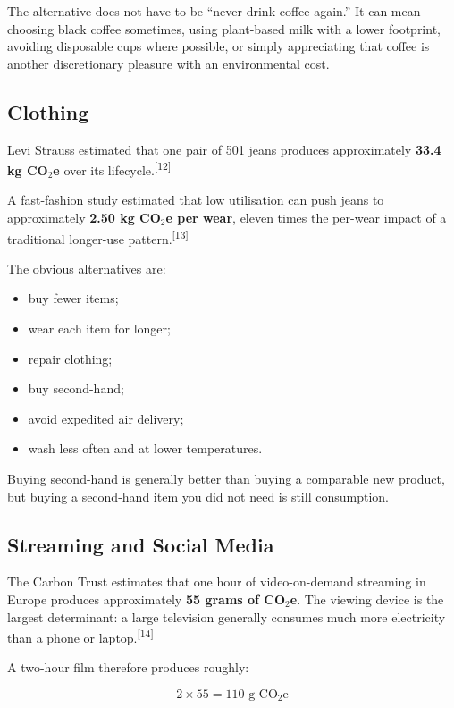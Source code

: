 \documentclass{article}
\begin{document}
The alternative does not have to be ``never drink coffee again.'' It can mean choosing black coffee sometimes, using plant-based milk with a lower footprint, avoiding disposable cups where possible, or simply appreciating that coffee is another discretionary pleasure with an environmental cost.

\subsection*{Clothing}

Levi Strauss estimated that one pair of 501 jeans produces approximately \textbf{33.4 kg CO$_2$e} over its lifecycle.\textsuperscript{[12]}

A fast-fashion study estimated that low utilisation can push jeans to approximately \textbf{2.50 kg CO$_2$e per wear}, eleven times the per-wear impact of a traditional longer-use pattern.\textsuperscript{[13]}

The obvious alternatives are:

\begin{itemize}[noitemsep]
    \item buy fewer items;
    \item wear each item for longer;
    \item repair clothing;
    \item buy second-hand;
    \item avoid expedited air delivery;
    \item wash less often and at lower temperatures.
\end{itemize}

Buying second-hand is generally better than buying a comparable new product, but buying a second-hand item you did not need is still consumption.

\subsection*{Streaming and Social Media}

The Carbon Trust estimates that one hour of video-on-demand streaming in Europe produces approximately \textbf{55 grams of CO$_2$e}. The viewing device is the largest determinant: a large television generally consumes much more electricity than a phone or laptop.\textsuperscript{[14]}

A two-hour film therefore produces roughly:

\[
2 \times 55
=
110\text{ g CO$_2$e}
\]
\end{document}

